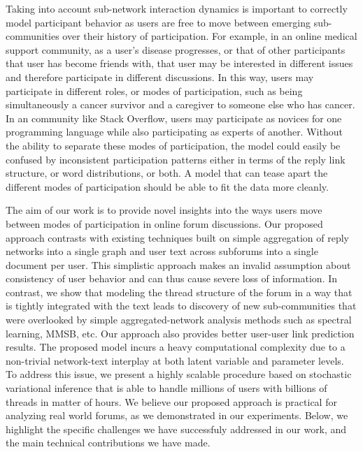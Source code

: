 \documentclass{sig-alternate}
\begin{document}
Taking into account sub-network interaction
dynamics is important to correctly model participant behavior as users are free to move between emerging sub-communities over their history of participation. For
example, in an online medical support community, as a user's disease progresses, or that of other participants that user has become friends with, that user may be interested in different issues and therefore participate in different discussions.  In this way, users may participate in different roles, or modes of participation, such as being simultaneously a cancer survivor and a caregiver to someone else who has cancer. In an community like Stack Overflow, users may participate as novices for one programming language while also participating as experts of another.  Without the ability to separate these modes of participation, the model could easily be confused by inconsistent participation patterns either in terms of the reply link structure, or word distributions, or both.  A model that can tease apart the different modes of participation should be able to fit the data more cleanly.

The aim of our work is to provide novel insights into the ways users move between modes of participation in online forum discussions. Our proposed approach contrasts with existing techniques built on  
simple aggregation of reply networks into a single graph and user 
text across subforums into a single document per user.  This simplistic approach makes an invalid assumption about consistency of user behavior and can thus cause severe loss of information. 
In contrast, we show that modeling the thread structure of the forum in a way that is tightly integrated with the text leads to discovery of new sub-communities that were overlooked by simple
aggregated-network analysis methods such as spectral learning, MMSB, etc. Our approach also 
provides better user-user link prediction results. 
The proposed model incurs a heavy computational complexity due to a non-trivial network-text interplay at both latent variable and parameter levels.  To address this issue, we present a highly scalable procedure based on stochastic variational inference that is able to handle millions of users with billions of threads in matter of hours. We believe our proposed approach is practical for analyzing real world forums, as we demonstrated in our experiments. Below, we highlight the specific challenges we have successfuly addressed in our work, and the main technical contributions we have made.

\vspace*{-0.5\baselineskip}
\end{document}
